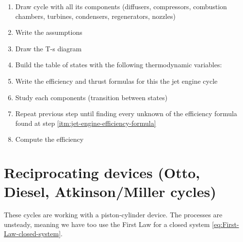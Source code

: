 \documentclass[10pt, twocolumn]{article}
\begin{document}
\begin{enumerate}
  \item Draw cycle with all its components (diffusers, compressors, combustion chambers, turbines, condensers, regenerators, nozzles)
  \item Write the assumptions
  \item Draw the T-s diagram
  \item Build the table of states with the following thermodynamic variables:
  \item \label{itm:jet-engine-efficiency-formula} Write the efficiency and thrust formulas for this the jet engine cycle
  \item Study each components (transition between states)
  \item Repeat previous step until finding every unknown of the efficiency formula found at step \ref{itm:jet-engine-efficiency-formula}
  \item Compute the efficiency
\end{enumerate}


\section{Reciprocating devices (Otto, Diesel, Atkinson/Miller cycles)}
These cycles are working with a piston-cylinder device.
The processes are unsteady, meaning we have too use the First Law for a closed system \eqref{eq:First-Law-closed-system}.
\end{document}
